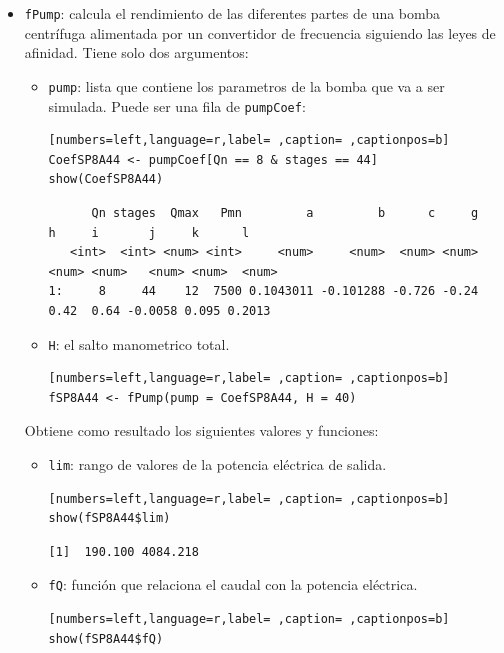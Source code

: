 \begin{itemize}
\item \texttt{fPump}: calcula el rendimiento de las diferentes partes de una bomba centrífuga alimentada por un convertidor de frecuencia siguiendo las leyes de afinidad. Tiene solo dos argumentos:
\begin{itemize}
\item \texttt{pump}: lista que contiene los parametros de la bomba que va a ser simulada. Puede ser una fila de \texttt{pumpCoef}:
\begin{lstlisting}[numbers=left,language=r,label= ,caption= ,captionpos=b]
CoefSP8A44 <- pumpCoef[Qn == 8 & stages == 44]
show(CoefSP8A44)
\end{lstlisting}

\begin{verbatim}
      Qn stages  Qmax   Pmn         a         b      c     g     h     i       j     k      l
   <int>  <int> <num> <int>     <num>     <num>  <num> <num> <num> <num>   <num> <num>  <num>
1:     8     44    12  7500 0.1043011 -0.101288 -0.726 -0.24  0.42  0.64 -0.0058 0.095 0.2013
\end{verbatim}

\item \texttt{H}: el salto manometrico total.
\begin{lstlisting}[numbers=left,language=r,label= ,caption= ,captionpos=b]
fSP8A44 <- fPump(pump = CoefSP8A44, H = 40)
\end{lstlisting}
\end{itemize}

Obtiene como resultado los siguientes valores y funciones:
\begin{itemize}
\item \texttt{lim}: rango de valores de la potencia eléctrica de salida.
\begin{lstlisting}[numbers=left,language=r,label= ,caption= ,captionpos=b]
show(fSP8A44$lim)
\end{lstlisting}

\begin{verbatim}
[1]  190.100 4084.218
\end{verbatim}

\item \texttt{fQ}: función que relaciona el caudal con la potencia eléctrica.
\begin{lstlisting}[numbers=left,language=r,label= ,caption= ,captionpos=b]
show(fSP8A44$fQ)
\end{lstlisting}


\end{itemize}
\end{itemize}

